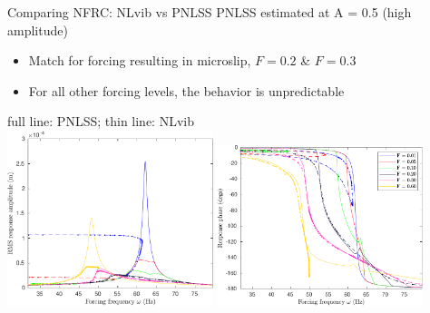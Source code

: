 \documentclass[9pt]{beamer}
\begin{document}
\begin{frame}{Comparing NFRC: NLvib vs PNLSS}
  PNLSS estimated at A = 0.5 (high amplitude)
  \begin{itemize}
  \item Match for forcing resulting in microslip, $F=0.2$ \& $F=0.3$
  \item For all other forcing levels, the behavior is unpredictable
  \end{itemize}
  \begin{center}
    full line: PNLSS; thin line: NLvib\\
    \includegraphics[width=0.45\textwidth]{fig/b4_pnlssfrf_A05_Amp}
    \includegraphics[width=0.45\textwidth]{fig/b4_pnlssfrf_A05_Phase}
  \end{center}
\end{frame}
\end{document}
